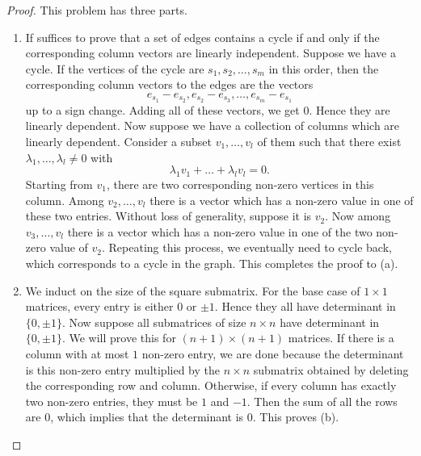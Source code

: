 \documentclass[12pt]{article}
\begin{document}
\begin{proof}
	This problem has three parts. 
	\begin{enumerate}[label = (\alph*)]
		\item If suffices to prove that a set of edges contains a cycle if and only if the corresponding column vectors are linearly independent. Suppose we have a cycle. If the vertices of the cycle are $s_1, s_2, \ldots, s_m$ in this order, then the corresponding column vectors to the edges are the vectors 
		\[
			e_{s_1} - e_{s_2}, e_{s_2} - e_{s_3}, \ldots, e_{s_m} - e_{s_1}
		\] 
		up to a sign change. Adding all of these vectors, we get $0$. Hence they are linearly dependent. Now suppose we have a collection of columns which are linearly dependent. Consider a subset $v_1, \ldots, v_l$ of them such that there exist $\lambda_1, \ldots, \lambda_l \neq 0$ with 
		\[
			\lambda_1 v_1 + \ldots + \lambda_l v_l = 0.
		\]
		Starting from $v_1$, there are two corresponding non-zero vertices in this column. Among $v_2, \ldots, v_l$ there is a vector which has a non-zero value in one of these two entries. Without loss of generality, suppose it is $v_2$. Now among $v_3, \ldots, v_l$ there is a vector which has a non-zero value in one of the two non-zero value of $v_2$. Repeating this process, we eventually need to cycle back, which corresponds to a cycle in the graph. This completes the proof to (a). 

		\item We induct on the size of the square submatrix. For the base case of $1 \times 1$ matrices, every entry is either $0$ or $\pm 1$. Hence they all have determinant in $\{0, \pm 1\}$. Now suppose all submatrices of size $n \times n$ have determinant in $\{0, \pm 1\}$. We will prove this for $(n+1) \times (n+1)$ matrices. If there is a column with at most $1$ non-zero entry, we are done because the determinant is this non-zero entry multiplied by the $n \times n$ submatrix obtained by deleting the corresponding row and column. Otherwise, if every column has exactly two non-zero entries, they must be $1$ and $-1$. Then the sum of all the rows are $0$, which implies that the determinant is $0$. This proves (b). 


\end{enumerate}
\end{proof}
\end{document}
